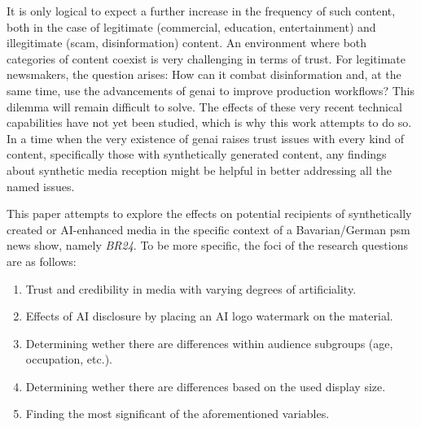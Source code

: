 \documentclass[
  a4paper,  %
  twoside,  %
  bibliography=totoc,
  headsepline,
  cleardoublepage=empty,
  parskip=half,
  draft=false
]{scrbook}
\begin{document}
It is only logical to expect a further increase in the frequency of such content, both in the case of legitimate (commercial, education, entertainment) and illegitimate (scam, disinformation) content. An environment where both categories of content coexist is very challenging in terms of trust. For legitimate newsmakers, the question arises: How can it combat disinformation and, at the same time, use the advancements of \gls{genai} to improve production workflows? This dilemma will remain difficult to solve. The effects of these very recent technical capabilities have not yet been studied, which is why this work attempts to do so. In a time when the very existence of \gls{genai} raises trust issues with every kind of content, specifically those with synthetically generated content, any findings about synthetic media reception might be helpful in better addressing all the named issues.

This paper attempts to explore the effects on potential recipients of synthetically created or AI-enhanced media in the specific context of a Bavarian/German \gls{psm} news show, namely \textit{BR24}. To be more specific, the foci of the research questions are as follows: 

\begin{enumerate}
  \item Trust and credibility in media with varying degrees of artificiality.
  \item Effects of AI disclosure by placing an AI logo watermark on the material.
  \item Determining wether there are differences within audience subgroups (age, occupation, etc.).
  \item Determining wether there are differences based on the used display size.
  \item Finding the most significant of the aforementioned variables.
\end{enumerate}
\end{document}
